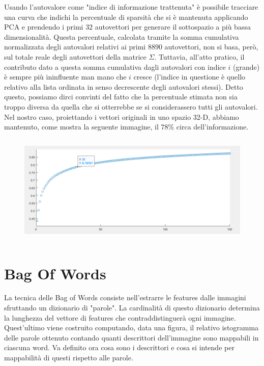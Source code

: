 \documentclass[]{report}
\begin{document}
	Usando l'autovalore come "indice di informazione trattenuta" è possibile tracciare una curva che indichi la percentuale di sparsità che si è mantenuta applicando PCA e prendendo i primi $32$ autovettori per generare il sottospazio a più bassa dimensionalità. Questa percentuale, calcolata tramite la somma cumulativa normalizzata degli autovalori relativi ai primi $8890$ autovettori, non si basa, però, sul totale reale degli autovettori della matrice $\Sigma$. Tuttavia, all'atto pratico, il contributo dato a questa somma cumulativa dagli autovalori con indice $i$ (grande) è sempre più ininfluente man mano che $i$ cresce (l'indice in questione è quello relativo alla lista ordinata in senso decrescente degli autovalori stessi). Detto questo, possiamo dirci convinti del fatto che la percentuale stimata non sia troppo diversa da quella che si otterrebbe se si considerassero tutti gli autovalori. 
	Nel nostro caso, proiettando i vettori originali in uno spazio 32-D, abbiamo mantenuto, come mostra la seguente immagine, il $78\%$ circa dell'informazione.   
	\begin{figure}[ht!]
	\includegraphics[width=\textwidth,height=200px]{./img/cum}
	\end{figure}
	

\section*{Bag Of Words}	    

	La tecnica delle Bag of Words consiste nell'estrarre le features dalle immagini sfruttando un dizionario di "parole". La cardinalità di questo dizionario determina la lunghezza del vettore di features che contraddistinguerà ogni immagine. Quest'ultimo viene costruito computando, data una figura, il relativo istogramma delle parole ottenuto contando quanti descrittori dell'immagine sono mappabili in ciascuna word. Va definito ora cosa sono i descrittori e cosa si intende per mappabilità di questi rispetto alle parole.
	
\end{document}
